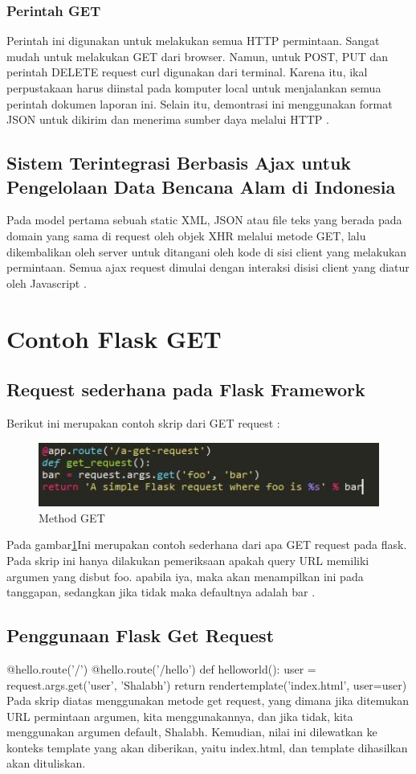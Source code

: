 \subsubsection{Perintah GET}
Perintah ini digunakan untuk melakukan semua HTTP permintaan. Sangat mudah untuk melakukan GET dari browser. Namun, untuk POST, PUT dan perintah DELETE request curl digunakan dari terminal. Karena itu, ikal perpustakaan harus diinstal pada komputer local untuk menjalankan semua perintah dokumen laporan ini. Selain itu, demontrasi ini menggunakan format JSON untuk dikirim dan menerima sumber daya melalui HTTP \cite{alemu2014rest}.
\subsection{Sistem Terintegrasi Berbasis Ajax untuk Pengelolaan Data Bencana Alam di Indonesia}
Pada model pertama sebuah static XML, JSON atau file teks yang berada pada domain yang sama di request oleh objek XHR melalui metode GET, lalu dikembalikan oleh server untuk ditangani oleh kode di sisi client yang melakukan permintaan. Semua ajax request dimulai dengan interaksi disisi client yang diatur oleh Javascript \cite{prasetyo2007sistem}.

\section{Contoh Flask GET}
\subsection{Request sederhana pada Flask Framework}
Berikut ini merupakan contoh skrip dari GET request :
\begin{figure}[ht]
\centerline{\includegraphics[width=1\textwidth]{figures/3FlaskGet.jpg}}
\caption{Method GET}
\label{labelgambar}
\end{figure}
Pada gambar\ref{labelgambar}Ini merupakan contoh sederhana dari apa GET request pada flask. Pada skrip ini hanya dilakukan pemeriksaan apakah query URL memiliki argumen yang disbut foo. apabila iya, maka akan menampilkan ini pada tanggapan, sedangkan jika tidak maka defaultnya adalah bar \cite{aggarwal2014flask}.
\subsection{Penggunaan Flask Get Request}
@hello.route('/')
@hello.route('/hello')
def helloworld():
user = request.args.get('user', 'Shalabh')
return rendertemplate('index.html', user=user)
Pada skrip diatas menggunakan metode get request, yang dimana jika ditemukan URL permintaan argumen, kita menggunakannya, dan jika tidak, kita menggunakan argumen default, Shalabh. Kemudian, nilai ini dilewatkan ke konteks template yang akan diberikan, yaitu index.html, dan template dihasilkan akan dituliskan\cite{aggarwal2014flask}.

